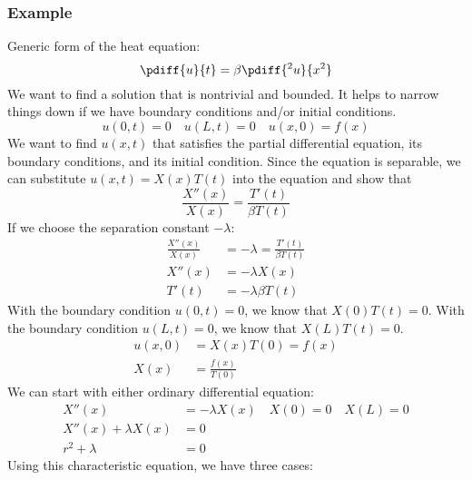 \documentclass{math}
\begin{document}
\subsubsection*{Example}
Generic form of the heat equation:
\[ \pdiff{u}{t} = \beta\pdiff{^2u}{x^2} \]
We want to find a solution that is nontrivial and bounded. It helps to narrow
things down if we have boundary conditions and/or initial conditions.
\[ u(0,t) = 0 \quad u(L,t) = 0 \quad u(x,0) = f(x) \]
We want to find \( u(x,t) \) that satisfies the partial differential equation,
its boundary conditions, and its initial condition. Since the equation is
separable, we can substitute \( u(x,t) = X(x)T(t) \) into the equation and show
that
\[ \frac{X''(x)}{X(x)} = \frac{T'(t)}{\beta T(t)} \]
If we choose the separation constant \( -\lambda \):
\begin{align*}
  \frac{X''(x)}{X(x)} &= -\lambda = \frac{T'(t)}{\beta T(t)} \\
  X''(x) &= -\lambda X(x) \\
  T'(t) &= -\lambda\beta T(t)
\end{align*}
With the boundary condition \( u(0,t) = 0 \), we know that \( X(0)T(t) = 0 \).
With the boundary condition \( u(L,t) = 0 \), we know that \( X(L)T(t) = 0 \).
\begin{align*}
  u(x,0) &= X(x)T(0) = f(x) \\
  X(x) &= \frac{f(x)}{T(0)}
\end{align*}
We can start with either ordinary differential equation:
\begin{align*}
  X''(x) &= -\lambda X(x) \quad X(0) = 0 \quad X(L) = 0 \\
  X''(x)+\lambda X(x) &= 0 \\
  r^2+\lambda &= 0
\end{align*}
Using this characteristic equation, we have three cases:
\end{document}
